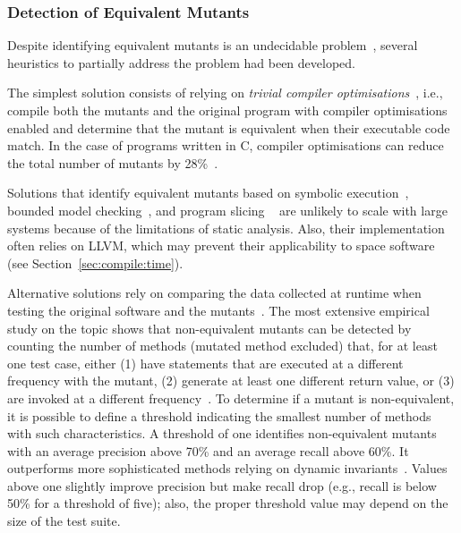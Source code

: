 \subsubsection{Detection of Equivalent Mutants}

Despite identifying equivalent mutants is an undecidable problem~\cite{madeyski2013overcoming,Bugg:Correctness:82}, several heuristics to partially address the problem had been developed. 

The simplest solution consists of relying on \emph{trivial compiler optimisations}~\cite{papadakis2015trivial, kintis2017detecting,papadakis2019mutation}, i.e., compile both the mutants and the original program with compiler optimisations enabled and determine that the mutant is equivalent when their executable code match. In the case of programs written in C, compiler optimisations can reduce the total number of mutants by 28\%~\cite{kintis2017detecting}.


Solutions that identify equivalent mutants based on symbolic execution~\cite{holling2016nequivack}, bounded model checking~\cite{riener2011test}, and program slicing ~\cite{harman2001relationship} are unlikely to scale with large systems because of the limitations of static analysis. Also, their implementation often relies on LLVM, which may prevent their applicability to space software (see Section~\ref{sec:compile:time}).

Alternative solutions rely on comparing the data collected at runtime when testing the original software and the mutants~\cite{grun2009impact,schuler2010covering,schuler2013covering}.
The most extensive empirical study on the topic shows that non-equivalent mutants can be detected by counting the number of methods (mutated method excluded) that, for at least one test case, either (1) have statements that are executed at a different frequency with the mutant, (2) generate at least one different return value, or (3) are invoked at a different frequency~\cite{schuler2013covering}. To determine if a mutant is non-equivalent, it is possible to define a threshold indicating the smallest number of methods with such characteristics. A threshold of one identifies non-equivalent mutants with an average precision above 70\% and an average recall above 60\%. It outperforms more sophisticated methods relying on dynamic invariants~\cite{schuler2009efficient}.
Values above one slightly improve precision but make recall drop (e.g., recall is below 50\% for a threshold of five); also, the proper threshold value may depend on the size of the test suite. 

